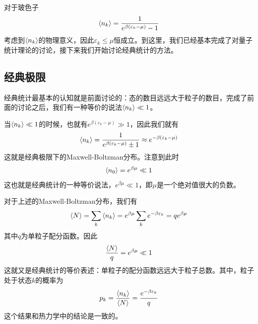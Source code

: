 对于玻色子
\begin{equation}
    \braket{n_k}=\frac{1}{e^{\beta(\varepsilon_k-\mu)}-1}
\end{equation}
考虑到$\braket{n_k}$的物理意义，因此$\varepsilon_k\le \mu$恒成立。到这里，我们已经基本完成了对量子统计理论的讨论，接下来我们开始讨论经典统计的方法。
\subsection{经典极限} %
\label{sub:经典极限}
经典统计最基本的认知就是前面讨论的：态的数目远远大于粒子的数目，完成了前面的讨论之后，我们有一种等价的说法$\braket{n_k}\ll 1$。

当$\braket{n_k}\ll 1$的时候，也就有$e^{\beta (\varepsilon_k-\mu)}\gg 1$，因此我们就有\begin{equation}
    \braket{n_k}=\frac{1}{e^{\beta(\varepsilon_k-\mu)}\pm 1}\approx e^{-\beta(\varepsilon_k-\mu)}
\end{equation}
这就是经典极限下的Maxwell-Boltzman分布。注意到此时\begin{equation}
    \braket{n_0} =e^{\beta \mu} \ll 1
\end{equation}
这也就是经典统计的一种等价说法，$e^{\beta \mu} \ll 1$，即$\mu$是一个绝对值很大的负数。

对于上述的Maxwell-Boltzman分布，我们有\begin{equation}
    \braket{N}=\sum_{k} \braket{n_k}=e^{\beta \mu} \sum_{k} e^{-\beta\varepsilon_k}=qe^{\beta \mu}
    \label{equ:N with exp beta mu}
\end{equation}
其中$q$为单粒子配分函数。因此\begin{equation}
    \frac{\braket{N}}{q}=e^{\beta \mu} \ll 1
\end{equation}
这就又是经典统计的等价表述：单粒子的配分函数远远大于粒子总数。其中，粒子处于状态$k$的概率为\begin{equation}
    p_k =\frac{\braket{n_k}}{\braket{N}}=\frac{e^{-\beta \varepsilon_k}}{q}
\end{equation}
这个结果和热力学中的结论是一致的。

